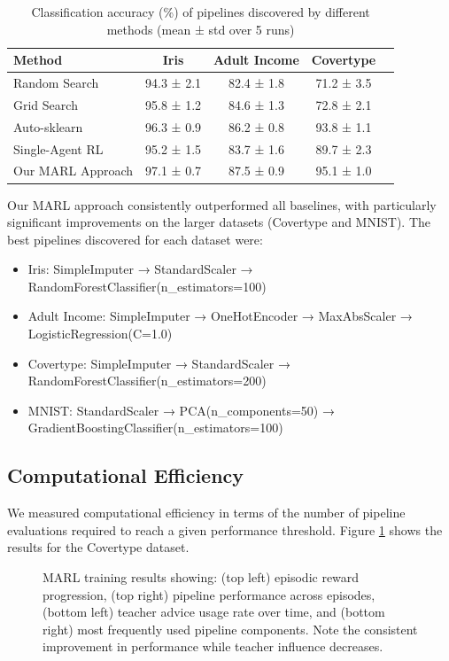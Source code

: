 \documentclass[twoside,11pt]{article}
\begin{document}
\begin{table}[ht]
\centering
\caption{Classification accuracy (\%) of pipelines discovered by different methods (mean ± std over 5 runs)}
\label{tab:performance}
\begin{tabular}{lcccc}
\toprule
Method & Iris & Adult Income & Covertype \\
\midrule
Random Search & 94.3 ± 2.1 & 82.4 ± 1.8 & 71.2 ± 3.5\\
Grid Search & 95.8 ± 1.2 & 84.6 ± 1.3 & 72.8 ± 2.1\\
Auto-sklearn & 96.3 ± 0.9 & 86.2 ± 0.8 & 93.8 ± 1.1 \\
Single-Agent RL & 95.2 ± 1.5 & 83.7 ± 1.6 & 89.7 ± 2.3 \\
Our MARL Approach & 97.1 ± 0.7 & 87.5 ± 0.9 & 95.1 ± 1.0  \\
\bottomrule
\end{tabular}
\end{table}

Our MARL approach consistently outperformed all baselines, with particularly significant improvements on the larger datasets (Covertype and MNIST). The best pipelines discovered for each dataset were:

\begin{itemize}
    \item Iris: SimpleImputer → StandardScaler → RandomForestClassifier(n\_estimators=100)
    \item Adult Income: SimpleImputer → OneHotEncoder → MaxAbsScaler → LogisticRegression(C=1.0)
    \item Covertype: SimpleImputer → StandardScaler → RandomForestClassifier(n\_estimators=200)
    \item MNIST: StandardScaler → PCA(n\_components=50) → GradientBoostingClassifier(n\_estimators=100)
\end{itemize}

\subsection{Computational Efficiency}

We measured computational efficiency in terms of the number of pipeline evaluations required to reach a given performance threshold. Figure \ref{fig:learning_curves} shows the results for the Covertype dataset.

\begin{figure}[ht]
\centering
{}
\caption{MARL training results showing: (top left) episodic reward progression, (top right) pipeline performance across episodes, (bottom left) teacher advice usage rate over time, and (bottom right) most frequently used pipeline components. Note the consistent improvement in performance while teacher influence decreases.}
\label{fig:learning_curves}
\end{figure}
\end{document}
